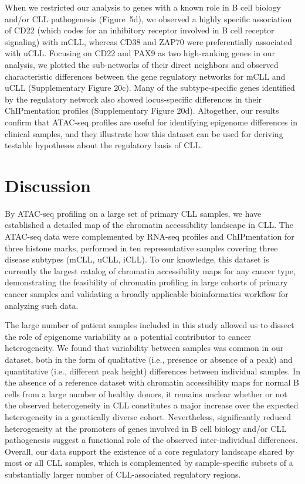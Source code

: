 \documentclass[10pt,]{article}
\begin{document}
When we restricted our analysis to genes with a known role in B cell
biology and/or CLL pathogenesis (Figure~5d), we observed a highly
specific association of CD22 (which codes for an inhibitory receptor
involved in B cell receptor signaling) with mCLL, whereas CD38 and ZAP70
were preferentially associated with uCLL. Focusing on CD22 and PAX9 as
two high-ranking genes in our analysis, we plotted the sub-networks of
their direct neighbors and observed characteristic differences between
the gene regulatory networks for mCLL and uCLL (Supplementary Figure
20c). Many of the subtype-specific genes identified by the regulatory
network also showed locus-specific differences in their ChIPmentation
profiles (Supplementary Figure 20d). Altogether, our results confirm
that ATAC-seq profiles are useful for identifying epigenome differences
in clinical samples, and they illustrate how this dataset can be used
for deriving testable hypotheses about the regulatory basis of CLL.

\section{Discussion}\label{discussion}

By ATAC-seq profiling on a large set of primary CLL samples, we have
established a detailed map of the chromatin accessibility landscape in
CLL. The ATAC-seq data were complemented by RNA-seq profiles and
ChIPmentation for three histone marks, performed in ten representative
samples covering three disease subtypes (mCLL, uCLL, iCLL). To our
knowledge, this dataset is currently the largest catalog of chromatin
accessibility maps for any cancer type, demonstrating the feasibility of
chromatin profiling in large cohorts of primary cancer samples and
validating a broadly applicable bioinformatics workflow for analyzing
such data.

The large number of patient samples included in this study allowed us to
dissect the role of epigenome variability as a potential contributor to
cancer heterogeneity\citep{Alizadeh2015}. We found that variability
between samples was common in our dataset, both in the form of
qualitative (i.e., presence or absence of a peak) and quantitative
(i.e., different peak height) differences between individual samples. In
the absence of a reference dataset with chromatin accessibility maps for
normal B cells from a large number of healthy donors, it remains unclear
whether or not the observed heterogeneity in CLL constitutes a major
increase over the expected heterogeneity in a genetically diverse
cohort. Nevertheless, significantly reduced heterogeneity at the
promoters of genes involved in B cell biology and/or CLL pathogenesis
suggest a functional role of the observed inter-individual differences.
Overall, our data support the existence of a core regulatory landscape
shared by most or all CLL samples, which is complemented by
sample-specific subsets of a substantially larger number of
CLL-associated regulatory regions.
\end{document}
